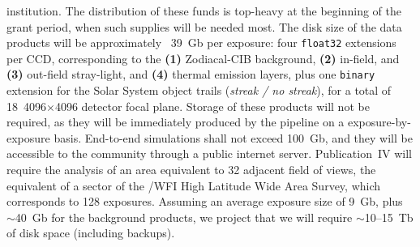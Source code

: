 \begin{table*}[h!]
{{ institution. The distribution of these funds is top-heavy at the beginning of the grant period, when such supplies will 
 be needed most. The disk size of the data products will be approximately ~39~Gb per exposure: four \texttt{float32} 
 extensions per CCD, corresponding to the \textbf{(1)} Zodiacal-CIB background, \textbf{(2)} in-field, and \textbf{(3)} 
 out-field stray-light, and \textbf{(4)} thermal emission layers, plus one \texttt{binary} extension for the Solar System 
 object trails (\emph{streak / no streak}), for a total of 18~4096$\times$4096 detector focal plane. 
 Storage of these products will not be required, as they will be immediately produced by the pipeline on a exposure-by-exposure 
 basis. End-to-end simulations shall not exceed 100~Gb, and they will be accessible to the community through a public internet server. 
 Publication~IV will require the analysis of an area equivalent to 32 adjacent field of views, the equivalent of a sector of 
 the \RST/WFI High Latitude Wide Area Survey, which corresponds to 128 exposures. Assuming an average exposure size of 9~Gb, 
 plus $\sim$40~Gb for the background products, we project that we will require $\sim$10--15~Tb of disk space (including backups).}
}
\label{tab:isANONnonlabor}
\end{table*}






